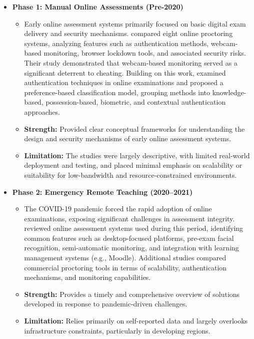 \begin{itemize}
\item \textbf{Phase 1: Manual Online Assessments (Pre-2020)}
    \begin{itemize}
        \item Early online assessment systems primarily focused on basic digital exam delivery and security mechanisms. \citet{FosterLayman2013} compared eight online proctoring systems, analyzing features such as authentication methods, webcam-based monitoring, browser lockdown tools, and associated security risks. Their study demonstrated that webcam-based monitoring served as a significant deterrent to cheating. Building on this work, \citet{KarimShukur2016} examined authentication techniques in online examinations and proposed a preference-based classification model, grouping methods into knowledge-based, possession-based, biometric, and contextual authentication approaches.
        \item \textbf{Strength:} Provided clear conceptual frameworks for understanding the design and security mechanisms of early online assessment systems.
        \item \textbf{Limitation:} The studies were largely descriptive, with limited real-world deployment and testing, and placed minimal emphasis on scalability or suitability for low-bandwidth and resource-constrained environments.
    \end{itemize}

\item \textbf{Phase 2: Emergency Remote Teaching (2020–2021)}
    \begin{itemize}
        \item The COVID-19 pandemic forced the rapid adoption of online examinations, exposing significant challenges in assessment integrity. \citet{Topuz2022} reviewed online assessment systems used during this period, identifying common features such as desktop-focused platforms, pre-exam facial recognition, semi-automatic monitoring, and integration with learning management systems (e.g., Moodle). Additional studies compared commercial proctoring tools in terms of scalability, authentication mechanisms, and monitoring capabilities.
        \item \textbf{Strength:} Provides a timely and comprehensive overview of solutions developed in response to pandemic-driven challenges.
        \item \textbf{Limitation:} Relies primarily on self-reported data and largely overlooks infrastructure constraints, particularly in developing regions.
    \end{itemize}



\end{itemize}
